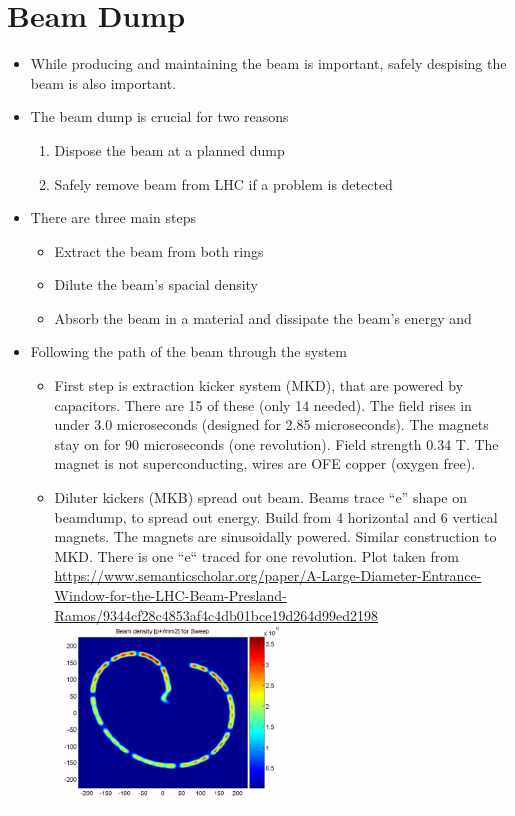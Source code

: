 \section{Beam Dump}
\begin{itemize}
    \item While producing and maintaining the beam is important, safely despising the beam is also important.
    \item The beam dump is crucial for two reasons \cite{lhcDesignV1}
    \begin{enumerate}\scriptsize
        \item Dispose the beam at a planned dump
        \item Safely remove beam from LHC if a problem is detected
    \end{enumerate}
    \item There are three main steps \cite{lhcDesignV1}
    \begin{itemize}\scriptsize
        \item Extract the beam from both rings
        \item Dilute the beam's spacial density
        \item Absorb the beam in a material and dissipate the beam's energy and 
    \end{itemize}
    \item Following the path of the beam through the system
    \begin{itemize}\scriptsize
        \item First step is extraction kicker system (MKD), that are powered by capacitors. There are 15 of these (only 14 needed). The field rises in under 3.0 microseconds (designed for 2.85 microseconds). The magnets stay on for 90 microseconds (one revolution). Field strength 0.34 T. The magnet is not superconducting, wires are OFE copper (oxygen free). \cite{lhcDesignV1}
        \item Diluter kickers (MKB) spread out beam. Beams trace ``e'' shape on beamdump, to spread out energy. Build from 4 horizontal and 6 vertical magnets. The magnets are sinusoidally powered. Similar construction to MKD. There is one ``e`` traced for one revolution. \cite{lhcDesignV1}
        {\color{red} Plot taken from \url{https://www.semanticscholar.org/paper/A-Large-Diameter-Entrance-Window-for-the-LHC-Beam-Presland-Ramos/9344cf28c4853af4c4db01bce19d264d99ed2198}}\\
        \includegraphics[width=0.5\textwidth]{figures/notes-experiment/beamdump.png}

\end{itemize}
\end{itemize}
